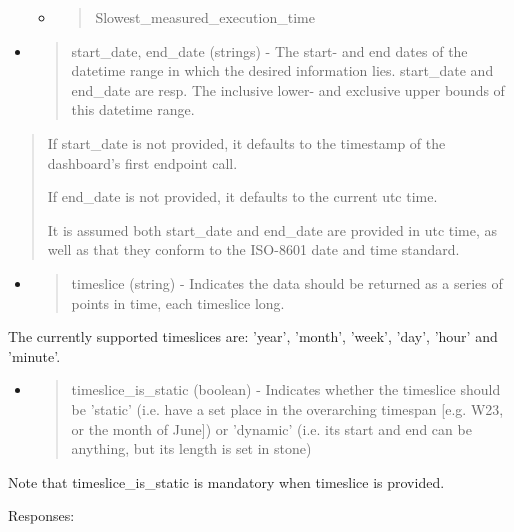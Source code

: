 \begin{itemize}
\begin{itemize}
\begin{quote}
    \end{quote}
  \item
    \begin{quote}
    Slowest\_measured\_execution\_time
    \end{quote}
  \end{itemize}
\item
  \begin{quote}
  start\_date, end\_date (strings) - The start- and end dates of the
  datetime range in which the desired information lies. start\_date and
  end\_date are resp. The inclusive lower- and exclusive upper bounds of
  this datetime range.
  \end{quote}
\end{itemize}

\begin{quote}
If start\_date is not provided, it defaults to the timestamp of the
dashboard's first endpoint call.

If end\_date is not provided, it defaults to the current utc time.

It is assumed both start\_date and end\_date are provided in utc time,
as well as that they conform to the ISO-8601 date and time standard.
\end{quote}

\begin{itemize}
\item
  \begin{quote}
  timeslice (string) - Indicates the data should be returned as a series
  of points in time, each timeslice long.
  \end{quote}
\end{itemize}

The currently supported timeslices are: 'year', 'month', 'week', 'day',
'hour' and 'minute'.

\begin{itemize}
\item
  \begin{quote}
  timeslice\_is\_static (boolean) - Indicates whether the timeslice
  should be 'static' (i.e. have a set place in the overarching timespan
  {[}e.g. W23, or the month of June{]}) or 'dynamic' (i.e. its start and
  end can be anything, but its length is set in stone)
  \end{quote}
\end{itemize}

Note that timeslice\_is\_static is {mandatory} when timeslice is
provided.

Responses:

